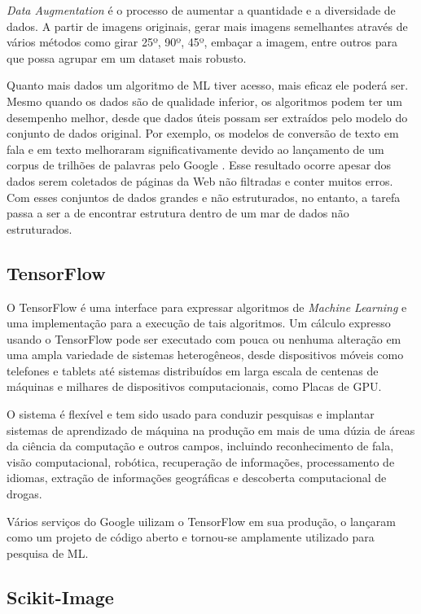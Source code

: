 \textit{Data Augmentation} é o processo de aumentar a quantidade e a diversidade de dados. A partir de imagens originais, gerar mais imagens semelhantes através de vários métodos como girar 25º, 90º, 45º, embaçar a imagem, entre outros para que possa agrupar em um dataset mais robusto.

Quanto mais dados um algoritmo de ML tiver acesso, mais eficaz ele poderá ser. Mesmo quando os dados são de qualidade inferior, os algoritmos podem ter um desempenho melhor, desde que dados úteis possam ser extraídos pelo modelo do conjunto de dados original. Por exemplo, os modelos de conversão de texto em fala e em texto melhoraram significativamente devido ao lançamento de um corpus de trilhões de palavras pelo Google \cite{halevy2009unreasonable}. Esse resultado ocorre apesar dos dados serem coletados de páginas da Web não filtradas e conter muitos erros. Com esses conjuntos de dados grandes e não estruturados, no entanto, a tarefa passa a ser a de encontrar estrutura dentro de um mar de dados não estruturados. \cite{dataAug}

\subsection{TensorFlow}

O TensorFlow é uma interface para expressar algoritmos de \textit{Machine Learning} e uma implementação para a execução de tais algoritmos. Um cálculo expresso usando o TensorFlow pode ser executado com pouca ou nenhuma alteração em uma ampla variedade de sistemas heterogêneos, desde dispositivos móveis como telefones e tablets até sistemas distribuídos em larga escala de centenas de máquinas e milhares de dispositivos computacionais, como Placas de GPU. 

O sistema é flexível e tem sido usado para conduzir pesquisas e implantar sistemas de aprendizado de máquina na produção em mais de uma dúzia de áreas da ciência da computação e outros campos, incluindo reconhecimento de fala, visão computacional, robótica, recuperação de informações, processamento de idiomas, extração de informações geográficas e descoberta computacional de drogas. \cite{abadi2016tensorflow}

Vários serviços do Google uilizam o TensorFlow em sua produção, o lançaram como um projeto de código aberto e
tornou-se amplamente utilizado para pesquisa de ML.\cite{199317}

\subsection{Scikit-Image}

